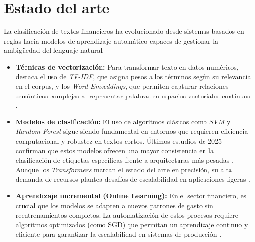 \section{Estado del arte}
\label{sec:estado_arte}

La clasificación de textos financieros ha evolucionado desde sistemas basados en reglas hacia modelos de aprendizaje automático capaces de gestionar la ambigüedad del lenguaje natural.

\begin{itemize}
    \item \textbf{Técnicas de vectorización:} Para transformar texto en datos numéricos, destaca el uso de \textit{TF-IDF}, que asigna pesos a los términos según su relevancia en el corpus, y los \textit{Word Embeddings}, que permiten capturar relaciones semánticas complejas al representar palabras en espacios vectoriales continuos \cite{Minaee2021}.
    
    \item \textbf{Modelos de clasificación:} El uso de algoritmos clásicos como \textit{SVM} y \textit{Random Forest} sigue siendo fundamental en entornos que requieren eficiencia computacional y robustez en textos cortos. Últimos estudios de 2025 confirman que estos modelos ofrecen una mayor consistencia en la clasificación de etiquetas específicas frente a arquitecturas más pesadas \cite{John2025}. Aunque los \textit{Transformers} marcan el estado del arte en precisión, su alta demanda de recursos plantea desafíos de escalabilidad en aplicaciones ligeras \cite{Minaee2021}.
    
    \item \textbf{Aprendizaje incremental (Online Learning):} En el sector financiero, es crucial que los modelos se adapten a nuevos patrones de gasto sin reentrenamientos completos. La automatización de estos procesos requiere algoritmos optimizados (como SGD) que permitan un aprendizaje continuo y eficiente para garantizar la escalabilidad en sistemas de producción \cite{Oyewole2024, Kolluri2019}.
\end{itemize}